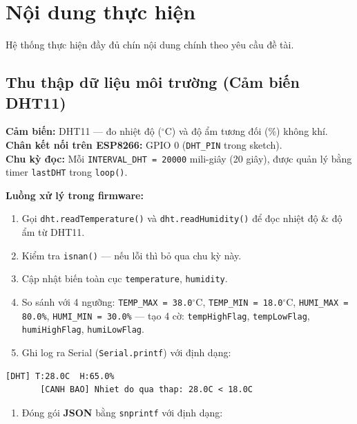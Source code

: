 \documentclass[13pt,a4paper]{article}
\newcommand{\code}[1]{\texttt{#1}}
\begin{document}
\section{Nội dung thực hiện}
\label{sec:noidung}

Hệ thống thực hiện đầy đủ chín nội dung chính theo yêu cầu đề tài.

\subsection{Thu thập dữ liệu môi trường (Cảm biến DHT11)}
\label{sec:thudulieu}

\textbf{Cảm biến:} DHT11 --- đo nhiệt độ ($^\circ$C) và độ ẩm tương đối (\%) không khí.\\
\textbf{Chân kết nối trên ESP8266:} GPIO 0 (\code{DHT\_PIN} trong sketch).\\
\textbf{Chu kỳ đọc:} Mỗi \code{INTERVAL\_DHT = 20000} mili-giây (20 giây), được quản lý bằng timer \code{lastDHT} trong \code{loop()}.

\textbf{Luồng xử lý trong firmware:}

\begin{enumerate}[label=\arabic*., leftmargin=1.5cm]
    \item Gọi \code{dht.readTemperature()} và \code{dht.readHumidity()} để đọc nhiệt độ \& độ ẩm từ DHT11.
    \item Kiểm tra \code{isnan()} --- nếu lỗi thì bỏ qua chu kỳ này.
    \item Cập nhật biến toàn cục \code{temperature}, \code{humidity}.
    \item So sánh với 4 ngưỡng: \code{TEMP\_MAX = 38.0}$^\circ$C, \code{TEMP\_MIN = 18.0}$^\circ$C, \code{HUMI\_MAX = 80.0\%}, \code{HUMI\_MIN = 30.0\%} --- tạo 4 cờ: \code{tempHighFlag}, \code{tempLowFlag}, \code{humiHighFlag}, \code{humiLowFlag}.
    \item Ghi log ra Serial (\code{Serial.printf}) với định dạng:
\end{enumerate}

\begin{lstlisting}[style=flowcode, caption={Serial log khi đọc DHT11}, label={lst:dhtlog}]
[DHT] T:28.0C  H:65.0%
       [CANH BAO] Nhiet do qua thap: 28.0C < 18.0C
\end{lstlisting}

\begin{enumerate}[label=\arabic*., leftmargin=1.5cm, resume]
    \item Đóng gói \textbf{JSON} bằng \code{snprintf} với định dạng:
\end{enumerate}
\end{document}
